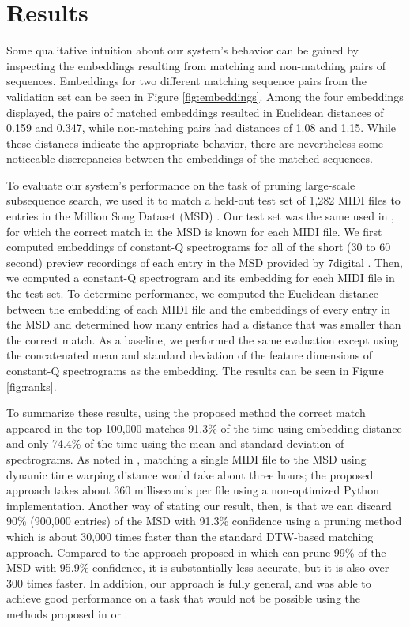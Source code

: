 \documentclass{article}
\begin{document}
\section{Results}
\label{sec:results}

Some qualitative intuition about our system's behavior can be gained by inspecting the embeddings resulting from matching and non-matching pairs of sequences.
Embeddings for two different matching sequence pairs from the validation set can be seen in Figure \ref{fig:embeddings}.
Among the four embeddings displayed, the pairs of matched embeddings resulted in Euclidean distances of 0.159 and 0.347, while non-matching pairs had distances of 1.08 and 1.15.
While these distances indicate the appropriate behavior, there are nevertheless some noticeable discrepancies between the embeddings of the matched sequences.

To evaluate our system's performance on the task of pruning large-scale subsequence search, we used it to match a held-out test set of 1,282 MIDI files to entries in the Million Song Dataset (MSD) \cite{bertin2011million}.
Our test set was the same used in \cite{raffel2015large}, for which the correct match in the MSD is known for each MIDI file.
We first computed embeddings of constant-Q spectrograms for all of the short (30 to 60 second) preview recordings of each entry in the MSD provided by 7digital \cite{schindler2012facilitating}.
Then, we computed a constant-Q spectrogram and its embedding for each MIDI file in the test set.
To determine performance, we computed the Euclidean distance between the embedding of each MIDI file and the embeddings of every entry in the MSD and determined how many entries had a distance that was smaller than the correct match.
As a baseline, we performed the same evaluation except using the concatenated mean and standard deviation of the feature dimensions of constant-Q spectrograms as the embedding.
The results can be seen in Figure \ref{fig:ranks}.

To summarize these results, using the proposed method the correct match appeared in the top 100,000 matches 91.3\% of the time using embedding distance and only 74.4\% of the time using the mean and standard deviation of spectrograms.
As noted in \cite{raffel2015large}, matching a single MIDI file to the MSD using dynamic time warping distance would take about three hours; the proposed approach takes about 360 milliseconds per file using a non-optimized Python implementation.
Another way of stating our result, then, is that we can discard 90\% (900,000 entries) of the MSD with 91.3\% confidence using a pruning method which is about 30,000 times faster than the standard DTW-based matching approach.
Compared to the approach proposed in \cite{raffel2015large} which can prune 99\% of the MSD with 95.9\% confidence, it is substantially less accurate, but it is also over 300 times faster.
In addition, our approach is fully general, and was able to achieve good performance on a task that would not be possible using the methods proposed in \cite{rakthanmanon2012searching} or \cite{papapetrou2011embedding}.
\end{document}
